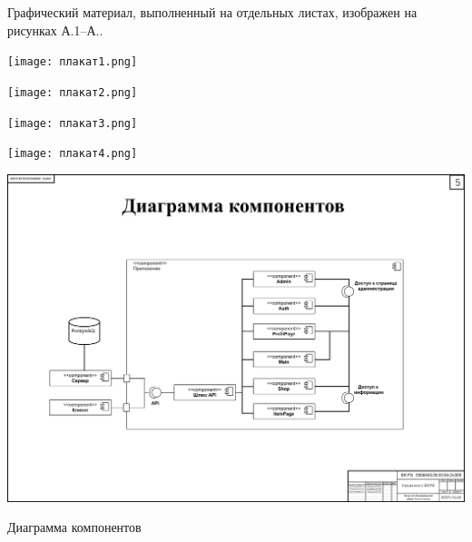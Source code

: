 
Графический материал, выполненный на отдельных листах,
изображен на рисунках А.1--А..
\setcounter{числоПлакатов}{0}

\renewcommand{\thefigure}{А.\arabic{figure}} %

\begin{landscape}

\begin{плакат}
    \texttt{[image: плакат1.png]}
    \label{pl1:image}      
\end{плакат}

\begin{плакат}
    \texttt{[image: плакат2.png]}
    \label{pl2:image}      
\end{плакат}

\begin{плакат}
    \texttt{[image: плакат3.png]}
    \label{pl3:image}      
\end{плакат}

\begin{плакат}
    \texttt{[image: плакат4.png]}
    \label{pl4:image}      
\end{плакат}

\begin{плакат}
	\centering
	\includegraphics[width=0.82\linewidth]{images/плакат5}
	\caption{Диаграмма компонентов}
	\label{pl5:image}
\end{плакат}


\end{landscape}
